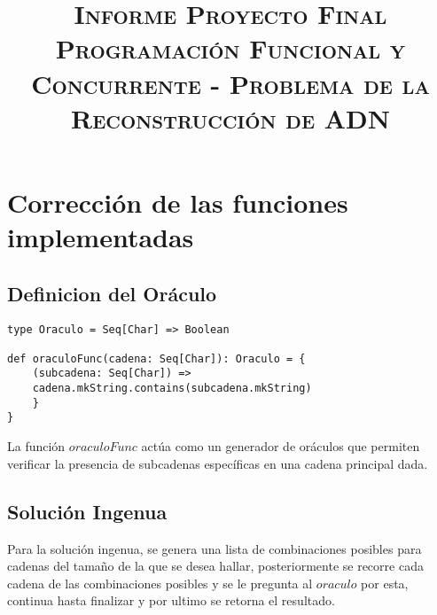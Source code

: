 \documentclass[conference]{IEEEtran}
\begin{document}
\title{\huge \textsc{Informe Proyecto Final Programación Funcional y Concurrente - Problema de la Reconstrucción de ADN}\\
}

\author{
\and
{}
}

\maketitle




\section{\textbf{Corrección de las funciones implementadas}}


\subsection{\textbf{Definicion del Oráculo}}
\begin{lstlisting}
type Oraculo = Seq[Char] => Boolean

def oraculoFunc(cadena: Seq[Char]): Oraculo = {
    (subcadena: Seq[Char]) => 
    cadena.mkString.contains(subcadena.mkString)
    }
}
\end{lstlisting}

La función $oraculoFunc$ actúa como un generador de oráculos que permiten verificar la presencia de subcadenas específicas en una cadena principal dada.

\subsection{\textbf{Solución Ingenua}}

Para la solución ingenua, se genera una lista de combinaciones posibles para cadenas del tamaño de la que se desea hallar, posteriormente se recorre cada cadena de las combinaciones posibles y se le pregunta al $oraculo$ por esta, continua hasta finalizar y por ultimo se retorna el resultado.
\end{document}
